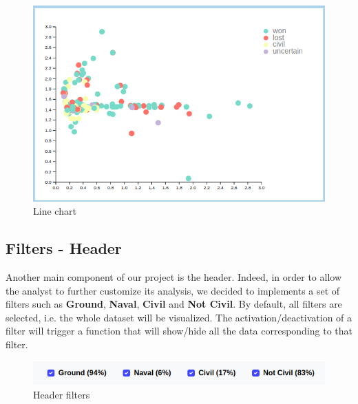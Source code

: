 \begin{figure}[h]
\centering
\includegraphics[scale=0.30]{./images/scatter_plot.png}
\caption{Line chart}
\end{figure}

\subsection{Filters - Header}
Another main component of our project is the header. Indeed, in order to allow the analyst to further customize its analysis, we decided to implements a set of filters such as \textbf{Ground}, \textbf{Naval}, \textbf{Civil} and \textbf{Not Civil}. By default, all filters are selected, i.e. the whole dataset will be visualized. The activation/deactivation of a filter will trigger a function that will show/hide all the data corresponding to that filter.
\begin{figure}[h]
\centering
\includegraphics[scale=0.32]{./images/header_filters.png}
\caption{Header filters}
\end{figure}